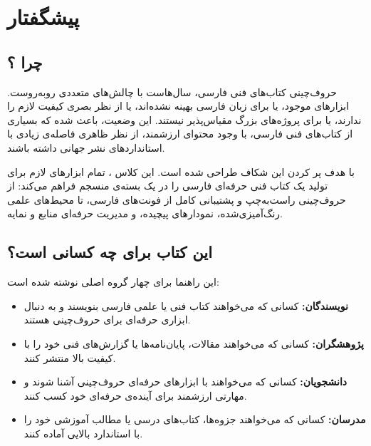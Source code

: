
\chapter*{پیشگفتار}
\label{ch:preface}

\section*{چرا ؟}

حروف‌چینی کتاب‌های فنی فارسی، سال‌هاست با چالش‌های
متعددی روبه‌روست. ابزارهای موجود، یا برای زبان فارسی
بهینه نشده‌اند، یا از نظر بصری کیفیت لازم را ندارند،
یا برای پروژه‌های بزرگ مقیاس‌پذیر نیستند. این وضعیت،
باعث شده که بسیاری از کتاب‌های فنی فارسی، با وجود
محتوای ارزشمند، از نظر ظاهری فاصله‌ی زیادی با
استانداردهای نشر جهانی داشته باشند.

 با هدف پر کردن این شکاف طراحی شده است.
این کلاس ، تمام ابزارهای لازم برای تولید
یک کتاب فنی حرفه‌ای فارسی را در یک بسته‌ی منسجم فراهم
می‌کند: از حروف‌چینی راست‌به‌چپ و پشتیبانی کامل از
فونت‌های فارسی، تا محیط‌های علمی رنگ‌آمیزی‌شده،
نمودارهای پیچیده، و مدیریت حرفه‌ای منابع و نمایه.

\section*{این کتاب برای چه کسانی است؟}

این راهنما برای چهار گروه اصلی نوشته شده است:

\begin{itemize}
    \item \textbf{نویسندگان:} کسانی که می‌خواهند کتاب
    فنی یا علمی فارسی بنویسند و به دنبال ابزاری حرفه‌ای
    برای حروف‌چینی هستند.

    \item \textbf{پژوهشگران:} کسانی که می‌خواهند مقالات،
    پایان‌نامه‌ها یا گزارش‌های فنی خود را با کیفیت
    بالا منتشر کنند.

    \item \textbf{دانشجویان:} کسانی که می‌خواهند با
    ابزارهای حرفه‌ای حروف‌چینی آشنا شوند و مهارتی
    ارزشمند برای آینده‌ی حرفه‌ای خود کسب کنند.

    \item \textbf{مدرسان:} کسانی که می‌خواهند جزوه‌ها،
    کتاب‌های درسی یا مطالب آموزشی خود را با استاندارد
    بالایی آماده کنند.
\end{itemize}

